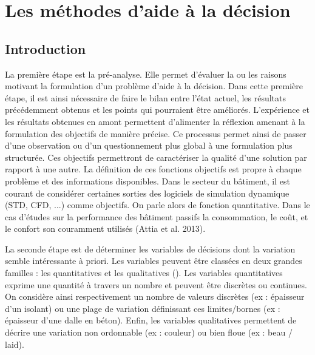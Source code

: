 
\section{Les méthodes d’aide à la décision} %
\label{sec:les_methodes_d_aide_à_la_decision}
\subsection{Introduction} %
\label{sub:introduction}


La première étape est la pré-analyse. Elle permet d’évaluer la ou les raisons
motivant la formulation d’un problème d’aide à la décision. Dans cette première étape,
il est ainsi nécessaire de faire le bilan entre l’état actuel, les résultats précédemment
obtenus et les points qui pourraient être améliorés.
L’expérience et les résultats obtenues en amont permettent d’alimenter
la réflexion amenant à la formulation des objectifs de manière précise.
Ce processus permet ainsi de passer d’une observation ou d’un questionnement plus global
à une formulation plus structurée.
Ces objectifs permettront de caractériser la qualité d’une solution par rapport à une autre.
La définition de ces fonctions objectifs est propre à chaque problème et des informations disponibles.
Dans le secteur du bâtiment, il est courant de considérer certaines sorties des
logiciels de simulation dynamique (STD, CFD, ...) comme objectifs. On parle alors
de fonction quantitative.
Dans le cas d’études sur la performance des bâtiment passifs la consommation, le coût,
et le confort son couramment utilisés (Attia et al. 2013).

La seconde étape est de déterminer les variables de décisions dont la variation
semble intéressante à priori. Les variables peuvent être classées en deux grandes
familles : les quantitatives et les qualitatives ().
Les variables quantitatives exprime une quantité à travers un nombre et
peuvent être discrètes ou continues. On considère ainsi respectivement un nombre de
valeurs discrètes (ex : épaisseur d’un isolant) ou une plage de variation définissant
ces limites/bornes (ex : épaisseur d’une dalle en béton).
Enfin, les variables qualitatives permettent de décrire une variation non ordonnable
(ex : couleur) ou bien floue (ex : beau / laid).

